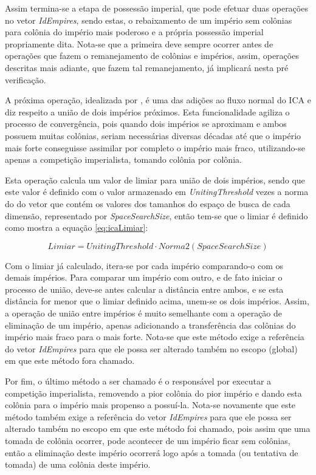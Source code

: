 Assim termina-se a etapa de possessão imperial, que pode efetuar duas operações no vetor \emph{IdEmpires}, sendo estas, o rebaixamento de um império sem colônias para colônia do império mais poderoso e a própria possessão imperial propriamente dita. Nota-se que a primeira deve sempre ocorrer antes de operações que fazem o remanejamento de colônias e impérios, assim, operações descritas mais adiante, que fazem tal remanejamento, já implicará nesta pré verificação.

A próxima operação, idealizada por \cite{roche2011imperialist}, é uma das adições ao fluxo normal do ICA e diz respeito a união de dois impérios próximos. Esta funcionalidade agiliza o processo de convergência, pois quando dois impérios se aproximam e ambos possuem muitas colônias, seriam necessárias diversas décadas até que o império mais forte conseguisse assimilar por completo o império mais fraco, utilizando-se apenas a competição imperialista, tomando colônia por colônia.

Esta operação calcula um valor de limiar para união de dois impérios, sendo que este valor é definido com o valor armazenado em \emph{UnitingThreshold} vezes a norma do do vetor que contém os valores dos tamanhos do espaço de busca de cada dimensão, representado por \emph{SpaceSearchSize}, então tem-se que o limiar é definido como mostra a equação \ref{eq:icaLimiar}: 

\begin{equation}
\label{eq:icaLimiar}
Limiar = UnitingThreshold \cdot Norma2(SpaceSearchSize) 
\end{equation}

Com o limiar já calculado, itera-se por cada império comparando-o com os demais impérios. Para comparar um império com outro, e de fato iniciar o processo de união, deve-se antes calcular a distância entre ambos, e se esta distância for menor que o limiar definido acima, unem-se os dois impérios. Assim, a operação de união entre impérios é muito semelhante com a operação de eliminação de um império, apenas adicionando a transferência das colônias do império mais fraco para o mais forte. Nota-se que este método exige a referência do vetor \emph{IdEmpires} para que ele possa ser alterado também no escopo (global) em que este método fora chamado.

Por fim, o último método a ser chamado é o responsável por executar a competição imperialista, removendo a pior colônia do pior império e dando esta colônia para o império mais propenso a possuí-la. Nota-se novamente que este método também exige a referência do vetor \emph{IdEmpires} para que ele possa ser alterado também no escopo em que este método foi chamado, pois assim que uma tomada de colônia ocorrer, pode acontecer de um império ficar sem colônias, então a eliminação deste império ocorrerá logo após a tomada (ou tentativa de tomada) de uma colônia deste império.

